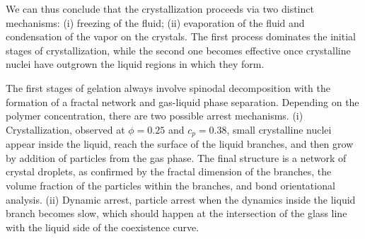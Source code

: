 \documentclass[12pt]{article}
\begin{document}
We can thus conclude that the crystallization proceeds via two distinct mechanisms:
(i) freezing of the fluid; (ii) evaporation of the fluid and condensation of the vapor on the crystals.
The first process dominates the initial stages of crystallization, while the second one becomes effective once
crystalline nuclei have outgrown the liquid regions in which they form. 
% 

The first stages of gelation always involve spinodal decomposition with the formation
of a fractal network and gas-liquid phase separation.
Depending on the polymer concentration, there are two possible arrest mechanisms.
(i) Crystallization, observed at $\phi=0.25$ and $c_p=0.38$, small crystalline nuclei appear inside the liquid, reach the surface
 of the liquid branches, and then grow by addition of particles from the gas phase. The final structure is a network of crystal droplets,
 as confirmed by the fractal dimension of the branches, the volume fraction of the particles within the branches, and bond orientational analysis.
(ii) Dynamic arrest, particle arrest when the dynamics inside the liquid branch becomes slow, which should happen at the intersection of the
 glass line with the liquid side of the coexistence curve.
\end{document}
